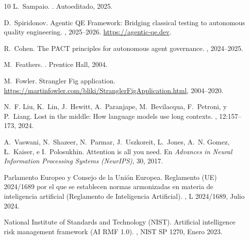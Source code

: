 \documentclass[11pt,a4paper]{article}
\begin{document}
\begin{thebibliography}{10}
L.~Sampaio.
.
\newblock Autoeditado, 2025.

D.~Spiridonov.
\newblock Agentic {QE} Framework: Bridging classical testing to autonomous quality engineering.
, 2025--2026. \url{https://agentic-qe.dev}.

R.~Cohen.
\newblock The {PACT} principles for autonomous agent governance.
, 2024--2025.

M.~Feathers.
.
\newblock Prentice Hall, 2004.

M.~Fowler.
\newblock Strangler {F}ig application.
\newblock \url{https://martinfowler.com/bliki/StranglerFigApplication.html}, 2004--2020.

N.~F. Liu, K.~Lin, J.~Hewitt, A.~Paranjape, M.~Bevilacqua, F.~Petroni, y P.~Liang.
\newblock Lost in the middle: How language models use long contexts.
, 12:157--173, 2024.

A.~Vaswani, N.~Shazeer, N.~Parmar, J.~Uszkoreit, L.~Jones, A.~N. Gomez, {\L}.~Kaiser, e I.~Polosukhin.
\newblock Attention is all you need.
\newblock En {\em Advances in Neural Information Processing Systems (NeurIPS)}, 30, 2017.

{Parlamento Europeo y Consejo de la Unión Europea}.
\newblock Reglamento ({UE}) 2024/1689 por el que se establecen normas armonizadas en materia de inteligencia artificial ({Reglamento de Inteligencia Artificial}).
, L 2024/1689, Julio 2024.

{National Institute of Standards and Technology (NIST)}.
\newblock Artificial intelligence risk management framework ({AI RMF 1.0}).
, NIST SP 1270, Enero 2023.

\end{thebibliography}
\end{document}
